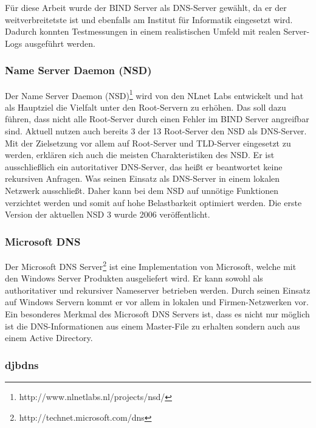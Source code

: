 \documentclass[a4paper, 12pt, BCOR10mm, DIV12, toc=bibliography, toc=listof, german]{scrbook}
\begin{document}
				Für diese Arbeit wurde der BIND Server als DNS-Server gewählt, da er der weitverbreitetste ist und
				ebenfalls am Institut für Informatik eingesetzt wird. Dadurch konnten Testmessungen in einem
				realistischen Umfeld mit realen Server-Logs ausgeführt werden. 
				

				\subsubsection*{Name Server Daemon (NSD)} %

				Der Name Server Daemon (NSD)\footnote{http://www.nlnetlabs.nl/projects/nsd/} wird von den
				NLnet Labs entwickelt und hat als Hauptziel die Vielfalt unter den Root-Servern zu erhöhen.
				Das soll dazu führen, dass nicht alle Root-Server durch einen Fehler im BIND Server
				angreifbar sind. Aktuell nutzen auch bereits 3 der 13 Root-Server den NSD als DNS-Server.
				Mit der Zielsetzung vor allem auf Root-Server und TLD-Server eingesetzt zu werden, erklären
				sich auch die meisten Charakteristiken des NSD. Er ist ausschließlich ein autoritativer
				DNS-Server, das heißt er beantwortet keine rekursiven Anfragen. Was seinen Einsatz als
				DNS-Server in einem lokalen Netzwerk ausschließt. Daher kann bei dem NSD auf unnötige
				Funktionen verzichtet werden und somit auf hohe Belastbarkeit optimiert werden. Die erste
				Version der aktuellen NSD 3 wurde 2006 veröffentlicht.
				

				\subsubsection*{Microsoft DNS} %

				Der Microsoft DNS Server\footnote{http://technet.microsoft.com/dns} ist eine Implementation
				von Microsoft, welche mit den Windows Server Produkten ausgeliefert wird. Er kann sowohl als
				authoritativer und rekursiver Nameserver betrieben werden. Durch seinen Einsatz auf Windows
				Servern kommt er vor allem in lokalen und Firmen-Netzwerken vor. Ein besonderes Merkmal des
				Microsoft DNS Servers ist, dass es nicht nur möglich ist die DNS-Informationen aus einem
				Master-File zu erhalten sondern auch aus einem Active Directory.
				

				\subsubsection*{djbdns} %
\end{document}
